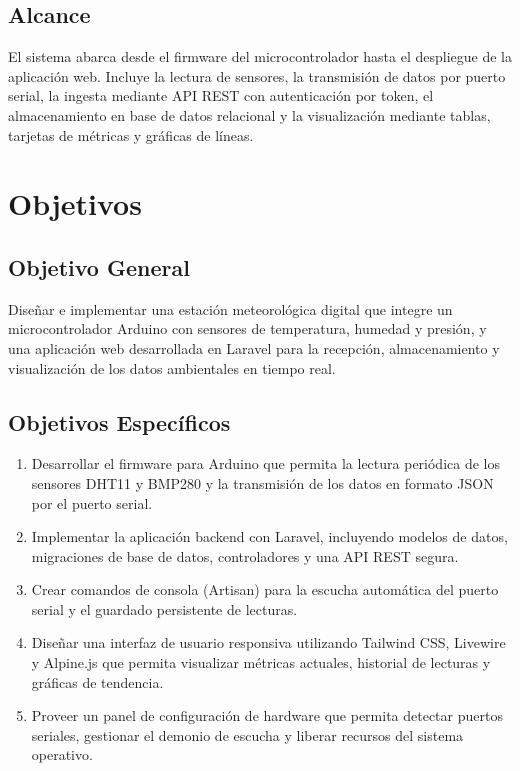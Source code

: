 \documentclass[12pt,a4paper]{report}
\begin{document}
\section{Alcance}
\label{sec:alcance}

El sistema abarca desde el firmware del microcontrolador hasta el despliegue de la aplicación web. Incluye la lectura de sensores, la transmisión de datos por puerto serial, la ingesta mediante API REST con autenticación por token, el almacenamiento en base de datos relacional y la visualización mediante tablas, tarjetas de métricas y gráficas de líneas.

\chapter{Objetivos}
\label{ch:objetivos}

\section{Objetivo General}
\label{sec:objetivo-general}

Diseñar e implementar una estación meteorológica digital que integre un microcontrolador Arduino con sensores de temperatura, humedad y presión, y una aplicación web desarrollada en Laravel para la recepción, almacenamiento y visualización de los datos ambientales en tiempo real.

\section{Objetivos Específicos}
\label{sec:objetivos-especificos}

\begin{enumerate}[leftmargin=*]
    \item Desarrollar el firmware para Arduino que permita la lectura periódica de los sensores DHT11 y BMP280 y la transmisión de los datos en formato JSON por el puerto serial.
    \item Implementar la aplicación backend con Laravel, incluyendo modelos de datos, migraciones de base de datos, controladores y una API REST segura.
    \item Crear comandos de consola (Artisan) para la escucha automática del puerto serial y el guardado persistente de lecturas.
    \item Diseñar una interfaz de usuario responsiva utilizando Tailwind CSS, Livewire y Alpine.js que permita visualizar métricas actuales, historial de lecturas y gráficas de tendencia.
    \item Proveer un panel de configuración de hardware que permita detectar puertos seriales, gestionar el demonio de escucha y liberar recursos del sistema operativo.
\end{enumerate}
\end{document}
